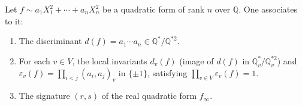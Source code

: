 Let $f \sim a_1 X_1^2 + \cdots + a_n X_n^2$ be a quadratic form of rank $n$ over $\mathbb{Q}$. One associates to it:
\begin{enumerate}
\item[(a)] The discriminant $d(f) = a_1 \cdots a_n \in \mathbb{Q}^*/\mathbb{Q}^{*2}$.
\item[(b)] For each $v \in V$, the local invariants $d_v(f)$ (image of $d(f)$ in $\mathbb{Q}_v^*/\mathbb{Q}_v^{*2}$) and $\varepsilon_v(f) = \prod_{i < j} (a_i, a_j)_v$ in $\{\pm 1\}$, satisfying $\prod_{v \in V} \varepsilon_v(f) = 1$.
\item[(c)] The signature $(r, s)$ of the real quadratic form $f_\infty$.
\end{enumerate}
